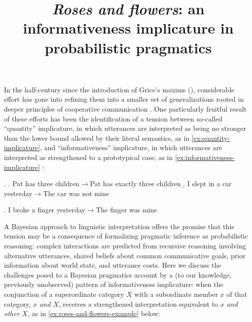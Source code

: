 \documentclass[11pt]{article}
\title{\vspace{-1.5cm}\large \bf \emph{Roses and flowers}: an informativeness implicature in
  probabilistic pragmatics\vspace{-2cm}}
\date{}
\begin{document}
\maketitle

\noindent
In the half-century since the introduction of Grice's maxims
(\citeyear{grice:1957,grice:1975}), considerable effort has gone
into refining them into a smaller set of generalizations rooted in
deeper principles of cooperative communication \citep[inter
alia]{horn:1984,sperber-wilson:1986,levinson:2000}. One particularly
fruitful result of these efforts has been the identification of a
tension between so-called ``quantity'' implicature, in which
utterances are interpreted as being no stronger than the lower bound
allowed by their literal semantics, as in \ref{ex:quantity-implicature}, and
``informativeness'' implicature, in which utterances are interpreted
as strengthened to a prototypical case, as in
\ref{ex:informativeness-implicature}
\citep{atlas-levinson:1981,horn:1984}:

\ex. \label{ex:quantity-implicature}
\a. Pat has three children$\rightarrow$Pat has exactly three children
\b. I slept in a car yesterday$\rightarrow$The car was not mine 

\ex. I broke a finger yesterday$\rightarrow$The finger was mine \label{ex:informativeness-implicature}

A Bayesian approach to linguistic
interpretation offers the promise that this tension may be a consequence of
 formalizing pragmatic inference as probabilistic reasoning:
 complex interactions are predicted from recursive reasoning involving alternative utterances, shared
beliefs about common communicative goals, prior information about
world state, and utterance costs.  Here we discuss the challenges
posed to a Bayesian pragmatics account by a (to our knowledge,
previously unobserved) pattern of informativeness implicature: when
the conjunction of a superordinate category $X$ with a subordinate
member $x$ of that category, \emph{$x$ and $X$}, receives a
strengthened interpretation equivalent to \emph{$x$ and other $X$}, as
in \ref{ex:roses-and-flowers-example} below:
\end{document}
